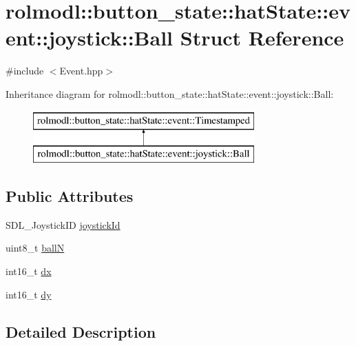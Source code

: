\hypertarget{structrolmodl_1_1button__state_1_1hat_state_1_1event_1_1joystick_1_1_ball}{}\section{rolmodl\+::button\+\_\+state\+::hat\+State\+::event\+::joystick\+::Ball Struct Reference}
\label{structrolmodl_1_1button__state_1_1hat_state_1_1event_1_1joystick_1_1_ball}


{\ttfamily \#include $<$Event.\+hpp$>$}

Inheritance diagram for rolmodl\+::button\+\_\+state\+::hat\+State\+::event\+::joystick\+::Ball\+:\begin{figure}[H]
\begin{center}
\leavevmode
\includegraphics[height=2.000000cm]{structrolmodl_1_1button__state_1_1hat_state_1_1event_1_1joystick_1_1_ball}
\end{center}
\end{figure}
\subsection*{Public Attributes}
\begin{DoxyCompactItemize}
\item 
S\+D\+L\+\_\+\+Joystick\+ID \mbox{\hyperlink{structrolmodl_1_1button__state_1_1hat_state_1_1event_1_1joystick_1_1_ball_af9c8b9326e14dcba542a6471d1c06723}{joystick\+Id}}
\item 
uint8\+\_\+t \mbox{\hyperlink{structrolmodl_1_1button__state_1_1hat_state_1_1event_1_1joystick_1_1_ball_ab9212c6250262a32c1d0b8a9d26606fe}{ballN}}
\item 
int16\+\_\+t \mbox{\hyperlink{structrolmodl_1_1button__state_1_1hat_state_1_1event_1_1joystick_1_1_ball_a237eb5d6d5af24a17f5b40b6857e0d68}{dx}}
\item 
int16\+\_\+t \mbox{\hyperlink{structrolmodl_1_1button__state_1_1hat_state_1_1event_1_1joystick_1_1_ball_a3cf7397dd5ec07cd2ebe03de43a412b0}{dy}}
\end{DoxyCompactItemize}


\subsection{Detailed Description}


